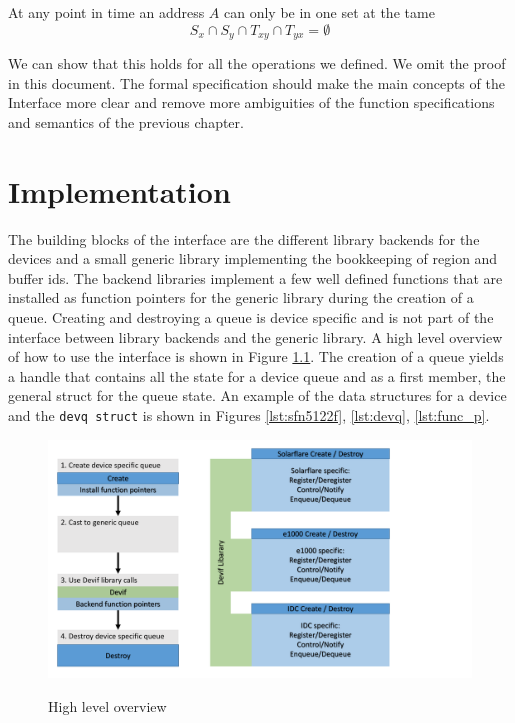 \documentclass[a4paper,11pt,twoside]{report}
\begin{document}
	\begin{inv}
		At any point in time an address $A$ can only be in one set at the tame
		\[ S_x \cap S_y \cap T_{xy} \cap T_{yx} = \emptyset \]
	\end{inv}	

	We can show that this holds for all the operations we defined. We omit the proof in this document.
	The formal specification should make the main concepts of the \devif Interface more clear and 
	remove more ambiguities of the function specifications and semantics of the previous chapter. 


\chapter{Implementation} 

The building blocks of the \devif interface are the different library backends for the devices
and a small generic library implementing the bookkeeping of region and buffer ids. The backend 
libraries implement a few well defined functions that are installed as function pointers
for the generic library during the creation of a queue. Creating and destroying a queue 
is device specific and is not part of the interface between library backends and the 
generic library. A high level overview of how to use the \devif interface is shown in Figure 
\ref{fig:overview}. The creation of a queue yields a handle that contains all the
state for a device queue and as a first member, the general struct for the \devif
queue state. An example of the data structures for a device and the \texttt{devq struct} 
is shown in Figures \ref{lst:sfn5122f}, \ref{lst:devq}, \ref{lst:func_p}.


\begin{figure}[h]
	\centering
	\caption{High level overview}
	\includegraphics[width=\textwidth]{pics/devif.pdf}
	\label{fig:overview}
\end{figure}  
\end{document}
